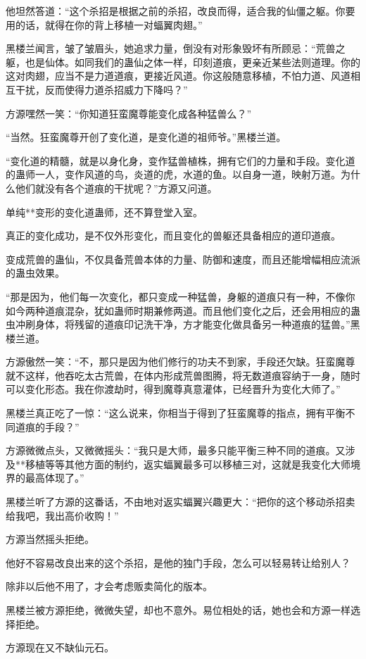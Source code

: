\begin{this_body}
他坦然答道：“这个杀招是根据之前的杀招，改良而得，适合我的仙僵之躯。你要用的话，就得在你的背上移植一对蝠翼肉翅。”

黑楼兰闻言，皱了皱眉头，她追求力量，倒没有对形象毁坏有所顾忌：“荒兽之躯，也是仙体。如同我们的蛊仙之体一样，印刻道痕，更亲近某些法则道理。你的这对肉翅，应当不是力道道痕，更接近风道。你这般随意移植，不怕力道、风道相互干扰，反而使得力道杀招威力下降吗？”

方源嘿然一笑：“你知道狂蛮魔尊能变化成各种猛兽么？”

“当然。狂蛮魔尊开创了变化道，是变化道的祖师爷。”黑楼兰道。

“变化道的精髓，就是以身化身，变作猛兽植株，拥有它们的力量和手段。变化道的蛊师一人，变作风道的鸟，炎道的虎，水道的鱼。以自身一道，映射万道。为什么他们就没有各个道痕的干扰呢？”方源又问道。

单纯**变形的变化道蛊师，还不算登堂入室。

真正的变化成功，是不仅外形变化，而且变化的兽躯还具备相应的道印道痕。

变成荒兽的蛊仙，不仅具备荒兽本体的力量、防御和速度，而且还能增幅相应流派的蛊虫效果。

“那是因为，他们每一次变化，都只变成一种猛兽，身躯的道痕只有一种，不像你如今两种道痕混杂，犹如蛊师时期兼修两道。而且他们变化之后，还会用相应的蛊虫冲刷身体，将残留的道痕印记洗干净，方才能变化做具备另一种道痕的猛兽。”黑楼兰道。

方源傲然一笑：“不，那只是因为他们修行的功夫不到家，手段还欠缺。狂蛮魔尊就不这样，他吞吃太古荒兽，在体内形成荒兽图腾，将无数道痕容纳于一身，随时可以变化形态。我在你渡劫时，得到魔尊真意灌体，已经晋升为变化大师了。”

黑楼兰真正吃了一惊：“这么说来，你相当于得到了狂蛮魔尊的指点，拥有平衡不同道痕的手段？”

方源微微点头，又微微摇头：“我只是大师，最多只能平衡三种不同的道痕。又涉及**移植等等其他方面的制约，返实蝠翼最多可以移植三对，这就是我变化大师境界的最高体现了。”

黑楼兰听了方源的这番话，不由地对返实蝠翼兴趣更大：“把你的这个移动杀招卖给我吧，我出高价收购！”

方源当然摇头拒绝。

他好不容易改良出来的这个杀招，是他的独门手段，怎么可以轻易转让给别人？

除非以后他不用了，才会考虑贩卖简化的版本。

黑楼兰被方源拒绝，微微失望，却也不意外。易位相处的话，她也会和方源一样选择拒绝。

方源现在又不缺仙元石。


\end{this_body}
